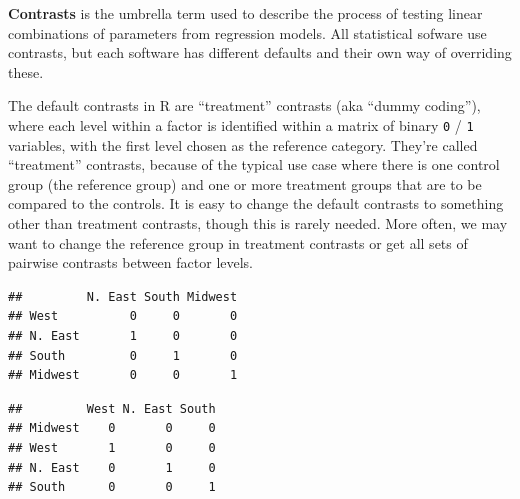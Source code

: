\documentclass[
]{book}
\newenvironment{Shaded}{\begin{snugshade}}{\end{snugshade}}
\newcommand{\CommentTok}[1]{\textcolor[rgb]{0.56,0.35,0.01}{\textit{#1}}}
\newcommand{\DataTypeTok}[1]{\textcolor[rgb]{0.13,0.29,0.53}{#1}}
\newcommand{\KeywordTok}[1]{\textcolor[rgb]{0.13,0.29,0.53}{\textbf{#1}}}
\newcommand{\NormalTok}[1]{#1}
\newcommand{\OperatorTok}[1]{\textcolor[rgb]{0.81,0.36,0.00}{\textbf{#1}}}
\newcommand{\StringTok}[1]{\textcolor[rgb]{0.31,0.60,0.02}{#1}}
\begin{document}
\textbf{Contrasts} is the umbrella term used to describe the process of testing linear combinations of parameters from regression models. All statistical sofware use contrasts, but each software has different defaults and their own way of overriding these.

The default contrasts in R are ``treatment'' contrasts (aka ``dummy coding''), where each level within a factor is identified within a matrix of binary \texttt{0} / \texttt{1} variables, with the first level chosen as the reference category. They're called ``treatment'' contrasts, because of the typical use case where there is one control group (the reference group) and one or more treatment groups that are to be compared to the controls. It is easy to change the default contrasts to something other than treatment contrasts, though this is rarely needed. More often, we may want to change the reference group in treatment contrasts or get all sets of pairwise contrasts between factor levels.

\begin{Shaded}
\end{Shaded}

\begin{verbatim}
##         N. East South Midwest
## West          0     0       0
## N. East       1     0       0
## South         0     1       0
## Midwest       0     0       1
\end{verbatim}

\begin{Shaded}
\end{Shaded}

\begin{verbatim}
##         West N. East South
## Midwest    0       0     0
## West       1       0     0
## N. East    0       1     0
## South      0       0     1
\end{verbatim}
\end{document}
